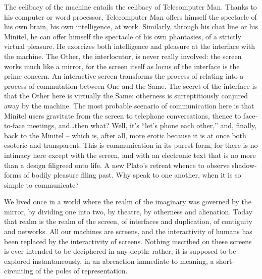 \documentclass[10pt,twoside,openright]{memoir}
\begin{document}
The celibacy of the machine entails the celibacy of Telecomputer Man. Thanks to his computer or word processor, Telecomputer Man offers himself the spectacle of his own brain, his own intelligence, at work. Similarly, through his chat line or his Minitel, he can offer himself the spectacle of his own phantasies, of a strictly virtual pleasure. He exorcizes both intelligence and pleasure at the interface with the machine. The Other, the interlocutor, is never really involved: the screen works much like a mirror, for the screen itself as locus of the interface is the prime concern. An interactive screen transforms the process of relating into a process of commutation between One and the Same. The secret of the interface is that the Other here is virtually the Same: otherness is surreptitiously conjured away by the machine. The most probable scenario of communication here is that Minitel users gravitate from the screen to telephone conversations, thence to face-to-face meetings, and\dots then what? Well, it's ``let's phone each other,'' and, finally, back to the Minitel -- which is, after all, more erotic because it is at once both esoteric and transparent. This is communication in its purest form, for there is no intimacy here except with the screen, and with an electronic text that is no more than a design filigreed onto life. A new Plato's retreat whence to observe shadow-forms of bodily pleasure filing past. Why speak to one another, when it is so simple to communicate?

We lived once in a world where the realm of the imaginary was governed by the mirror, by dividing one into two, by theatre, by otherness and alienation. Today that realm is the realm of the screen, of interfaces and duplication, of contiguity and networks. All our machines are screens, and the interactivity of humans has been replaced by the interactivity of screens. Nothing inscribed on these screens is ever intended to be deciphered in any depth: rather, it is supposed to be explored instantaneously, in an abreaction immediate to meaning, a short-circuiting of the poles of representation.
\end{document}
